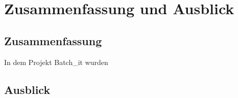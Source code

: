 

\chapter{Zusammenfassung und Ausblick} \label{chapter:conclusion}
\section{Zusammenfassung}
In dem Projekt Batch\_it wurden 
\section{Ausblick}

